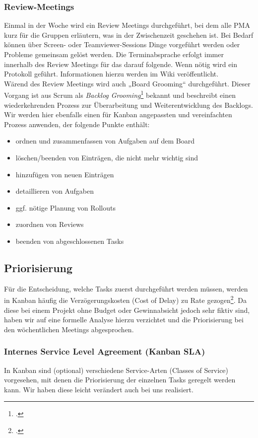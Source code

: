 \subsubsection{Review-Meetings}
Einmal in der Woche wird ein Review Meetings durchgeführt, bei dem alle PMA kurz für die Gruppen erläutern, was in der Zwischenzeit geschehen ist. Bei Bedarf können über Screen- oder Teamviewer-Sessions Dinge vorgeführt werden oder Probleme gemeinsam gelöst werden. Die Terminabsprache erfolgt immer innerhalb des Review Meetings für das darauf folgende. Wenn nötig wird ein Protokoll geführt. Informationen hierzu werden im Wiki veröffentlicht. \\

Wärend des Review Meetings wird auch „Board Grooming“ durchgeführt. Dieser Vorgang ist aus Scrum als \textit{Backlog Grooming}\footcite{wikiScrum} bekannt und beschreibt einen wiederkehrenden Prozess zur Überarbeitung und Weiterentwicklung des Backlogs. Wir werden hier ebenfalls einen für Kanban angepassten und vereinfachten Prozess anwenden, der folgende Punkte enthält:

\begin{itemize}
\item ordnen und zusammenfassen von Aufgaben auf dem Board
\item löschen/beenden von Einträgen, die nicht mehr wichtig sind
\item hinzufügen von neuen Einträgen
\item detaillieren von Aufgaben
\item ggf. nötige Planung von Rollouts
\item zuordnen von Reviews
\item beenden von abgeschlossenen Tasks
\end{itemize}

\subsection{Priorisierung}
\label{subsec:priorisierung}
Für die Entscheidung, welche Tasks zuerst durchgeführt werden müssen, werden in Kanban häufig die Verzögerungskosten (Cost of Delay) zu Rate gezogen\footcite{wikiKanban}. Da diese bei einem Projekt ohne Budget oder Gewinnabsicht jedoch sehr fiktiv sind, haben wir auf eine formelle Analyse hierzu verzichtet und die Priorisierung bei den wöchentlichen Meetings abgesprochen.

\subsubsection{Internes Service Level Agreement (Kanban SLA)}
In Kanban sind (optional) verschiedene Service-Arten (Classes of Service) vorgesehen, mit denen die Priorisierung der einzelnen Tasks geregelt werden kann. Wir haben diese leicht verändert auch bei uns realisiert.

